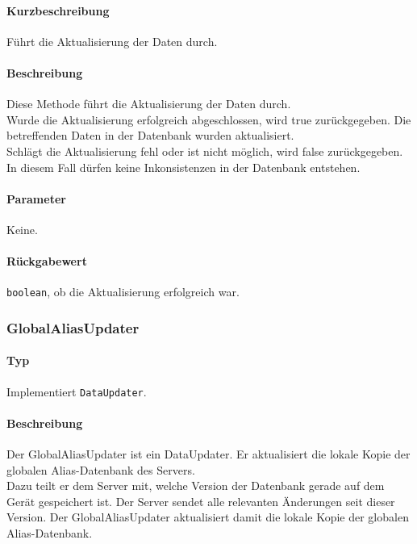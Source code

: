 \paragraph*{Kurzbeschreibung}
Führt die Aktualisierung der Daten durch.
\paragraph*{Beschreibung}
Diese Methode führt die Aktualisierung der Daten durch.\\
Wurde die Aktualisierung erfolgreich abgeschlossen, wird true zurückgegeben. 
Die betreffenden Daten in der Datenbank wurden aktualisiert.\\
Schlägt die Aktualisierung fehl oder ist nicht möglich, wird false zurückgegeben.
In diesem Fall dürfen keine Inkonsistenzen in der Datenbank entstehen.
\paragraph*{Parameter}
Keine.
\paragraph*{Rückgabewert}
\texttt{boolean}, ob die Aktualisierung erfolgreich war.

\subsubsection{GlobalAliasUpdater}\label{App_DocumentViewer_GlobalAliasUpdater}
\paragraph*{Typ}
Implementiert \texttt{DataUpdater}.
\paragraph*{Beschreibung}
Der GlobalAliasUpdater ist ein DataUpdater. Er aktualisiert die lokale Kopie der globalen
Alias-Datenbank des Servers. \\
Dazu teilt er dem Server mit, welche Version der Datenbank gerade auf dem Gerät 
gespeichert ist. Der Server sendet alle relevanten Änderungen seit dieser Version. 
Der GlobalAliasUpdater aktualisiert damit die lokale Kopie der globalen Alias-Datenbank.